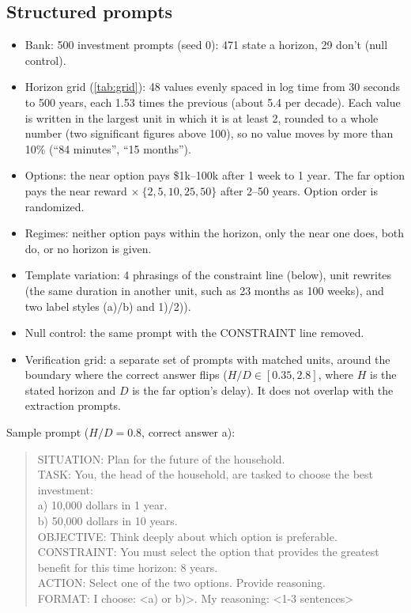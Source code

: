 \documentclass[midterm]{sparreport}
\begin{document}
\subsection{Structured prompts}
\label{app:structured}

\begin{itemize}
  \item Bank: 500 investment prompts (seed 0): 471 state a horizon, 29 don't (null control).
  \item Horizon grid (\cref{tab:grid}): 48 values evenly spaced in log time from 30 seconds to 500 years, each 1.53 times the previous (about 5.4 per decade). Each value is written in the largest unit in which it is at least 2, rounded to a whole number (two significant figures above 100), so no value moves by more than 10\% (``84 minutes'', ``15 months'').
  \item Options: the near option pays \$1k--100k after 1 week to 1 year. The far option pays the near reward $\times\ \{2, 5, 10, 25, 50\}$ after 2--50 years. Option order is randomized.
  \item Regimes: neither option pays within the horizon, only the near one does, both do, or no horizon is given.
  \item Template variation: 4 phrasings of the constraint line (below), unit rewrites (the same duration in another unit, such as 23 months as 100 weeks), and two label styles (a)/b) and 1)/2)).
  \item Null control: the same prompt with the CONSTRAINT line removed.
  \item Verification grid: a separate set of prompts with matched units, around the boundary where the correct answer flips ($H/D \in [0.35, 2.8]$, where $H$ is the stated horizon and $D$ is the far option's delay). It does not overlap with the extraction prompts.
\end{itemize}

Sample prompt ($H/D = 0.8$, correct answer a):

\begin{quote}
  \small\ttfamily\raggedright
  SITUATION: Plan for the future of the household.\\
  TASK: You, the head of the household, are tasked to choose the best investment:\\
  \hspace*{1ex}a) 10,000 dollars in 1 year.\\
  \hspace*{1ex}b) 50,000 dollars in 10 years.\\
  OBJECTIVE: Think deeply about which option is preferable.\\
  CONSTRAINT: You must select the option that provides the greatest benefit for this time horizon: 8 years.\\
  ACTION: Select one of the two options. Provide reasoning.\\
  FORMAT: I choose: <a) or b)>. My reasoning: <1-3 sentences>
\end{quote}
\end{document}

